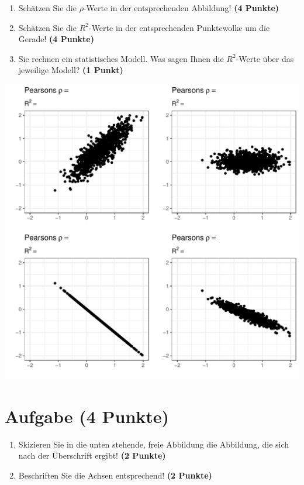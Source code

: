 \documentclass[a4paper, 10pt]{scrartcl}\usepackage[]{graphicx}\usepackage[]{xcolor}
\makeatletter
\def\maxwidth{ %
  \ifdim\Gin@nat@width>\linewidth
    \linewidth
  \else
    \Gin@nat@width
  \fi
}
\makeatother
\begin{document}
\begin{enumerate}
\item Sch{\"a}tzen Sie die $\rho$-Werte in der entsprechenden
  Abbildung! \textbf{(4 Punkte)}
\item Sch{\"a}tzen Sie die $R^2$-Werte in der entsprechenden
  Punktewolke um die Gerade! \textbf{(4 Punkte)}
\item Sie rechnen ein statistisches Modell. Was sagen Ihnen die $R^2$-Werte
  {\"u}ber das jeweilige Modell? \textbf{(1 Punkt)}
\end{enumerate}




{\centering \includegraphics[width=\maxwidth]{img/correlation-02-1} 

}



 
\clearpage

\section{Aufgabe \hfill (4 Punkte)}



\begin{enumerate}
\item Skizieren Sie in die unten stehende, freie Abbildung die
  Abbildung, die sich nach der {\"U}berschrift ergibt! \textbf{(2 Punkte)}
\item Beschriften Sie die Achsen entsprechend! \textbf{(2 Punkte)}
\end{enumerate}
\end{document}
